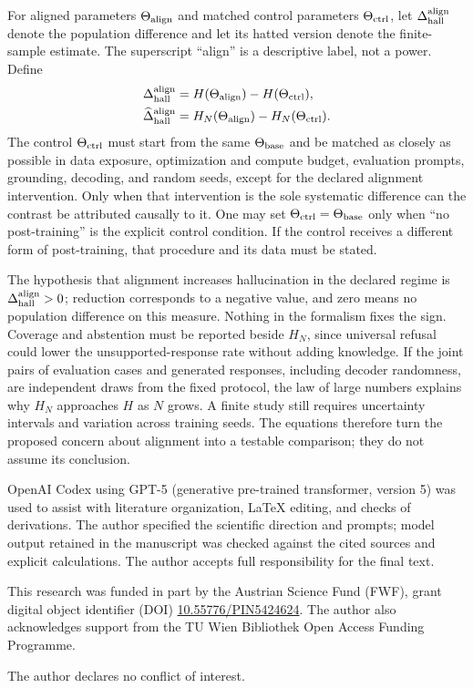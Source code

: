 \documentclass[
  aps,
  reprint,
  superscriptaddress,
  floatfix,
  nofootinbib,
  longbibliography
]{revtex4-2}
\begin{document}
For aligned parameters $\Theta_{\rm align}$ and matched control parameters
$\Theta_{\rm ctrl}$, let $\Delta_{\rm hall}^{\rm align}$ denote the population
difference and let its hatted version denote the finite-sample estimate.  The
superscript ``align'' is a descriptive label, not a power.  Define
\begin{equation}
\label{eq:app-hallucination-test}
\begin{aligned}
\Delta_{\rm hall}^{\rm align}
&=H(\Theta_{\rm align})-H(\Theta_{\rm ctrl}),\\
\widehat{\Delta}_{\rm hall}^{\rm align}
&=H_N(\Theta_{\rm align})-H_N(\Theta_{\rm ctrl}).
\end{aligned}
\end{equation}
The control $\Theta_{\rm ctrl}$ must start from the same $\Theta_{\rm base}$
and be matched as closely as possible in data exposure, optimization and
compute budget, evaluation prompts, grounding, decoding, and random seeds,
except for the declared alignment intervention.  Only when that intervention is
the sole systematic difference can the contrast be attributed causally to it.
One may set
$\Theta_{\rm ctrl}=\Theta_{\rm base}$ only when ``no post-training'' is the
explicit control condition.  If the control receives a different form of
post-training, that procedure and its data must be stated.

The hypothesis that alignment increases hallucination in the declared regime
is $\Delta_{\rm hall}^{\rm align}>0$; reduction corresponds to a negative
value, and zero means no population difference on this measure.  Nothing in
the formalism fixes the sign.  Coverage and abstention must be reported beside
$H_N$, since universal refusal could lower the unsupported-response rate
without adding knowledge.  If the joint pairs of evaluation cases and generated
responses, including decoder randomness, are independent draws from the fixed
protocol, the law of large numbers explains why $H_N$ approaches $H$ as $N$
grows.  A finite study still requires uncertainty intervals and
variation across training seeds.  The equations therefore turn the proposed
concern about alignment into a testable comparison; they do not assume its
conclusion.

\begin{acknowledgments}
OpenAI Codex using GPT-5 (generative pre-trained transformer, version 5) was
used to assist with literature organization, \LaTeX{}
editing, and checks of derivations.  The author specified the scientific
direction and prompts; model output retained in the manuscript was checked
against the cited sources and explicit calculations.  The author accepts full
responsibility for the final text.

This research was funded in part by the Austrian Science Fund (FWF), grant
digital object identifier (DOI)
\href{https://doi.org/10.55776/PIN5424624}{10.55776/PIN5424624}.
The author also acknowledges support from the TU Wien Bibliothek Open Access
Funding Programme.

The author declares no conflict of interest.
\end{acknowledgments}




\end{document}

